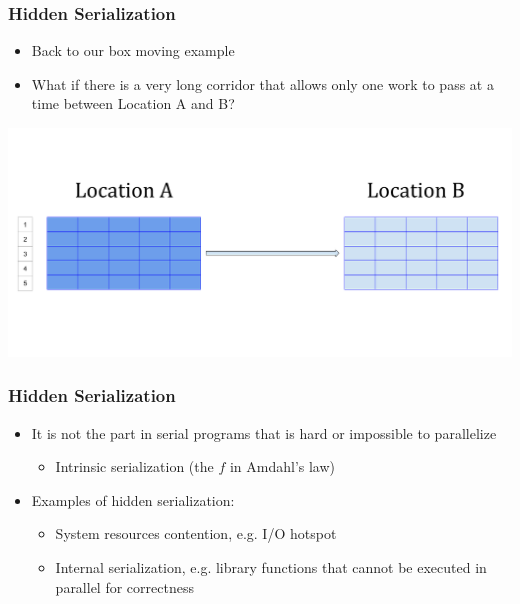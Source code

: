 \documentclass[10pt,t]{beamer}
\begin{document}
\begin{frame}
  \frametitle{Hidden Serialization}
  \begin{itemize}
  \item Back to our box moving example
  \item What if there is a very long corridor that allows only one work to pass at a time between Location A and B?
  \end{itemize}
  \includegraphics[width=\textwidth]{./Parallel_Load}
\end{frame}

\begin{frame}
  \frametitle{Hidden Serialization}
  \begin{itemize}
  \item It is not the part in serial programs that is hard or impossible to parallelize
    \begin{itemize}
    \item Intrinsic serialization (the $f$ in Amdahl's law)
    \end{itemize}
  \item Examples of hidden serialization:
    \begin{itemize}
    \item System resources contention, e.g. I/O hotspot
    \item Internal serialization, e.g. library functions that cannot be executed in parallel for correctness
    \end{itemize}
  \end{itemize}
\end{frame}
\end{document}
